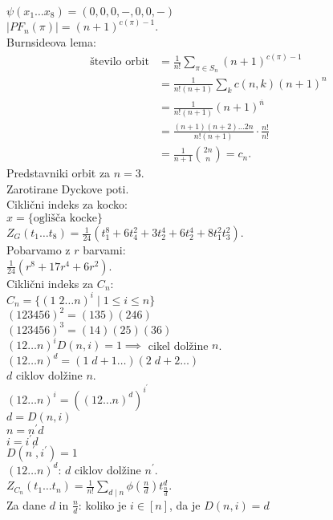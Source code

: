 \documentclass[a4paper, 12pt]{book}
\theoremstyle{definition}
\theoremstyle{remark}
\begin{document}
$\psi(x_1 \dots x_8) = (0, 0, 0, -, 0, 0, -)$ \\
$|PF_n(\pi)| = (n+1)^{c(\pi)-1}$. \\
Burnsideova lema:
\begin{align*}
  \text{število orbit} &= \frac{1}{n!} \sum_{\pi \in S_n} (n+1)^{c(\pi)-1} \\
  &= \frac{1}{n! (n+1)} \sum_k c(n, k) (n+1)^n \\
  &= \frac{1}{n! (n+1)} (n+1)^{\overline{n}} \\
  &= \frac{(n+1) (n+2) \dots 2n}{n! (n+1)} \cdot \frac{n!}{n!} \\
  &= \frac{1}{n+1} \binom{2n}{n} = c_n.
\end{align*}
Predstavniki orbit za $n=3$. \\
Zarotirane Dyckove poti. \\
Ciklični indeks za kocko: \\
$x = \{\text{oglišča kocke}\}$ \\
$Z_G(t_1 \dots t_8) = \frac{1}{24} \left(t_1^8 + 6 t_4^2 + 3 t_2^4 + 6 t_2^4 + 8 t_1^2 t_3^2\right)$. \\
Pobarvamo z $r$ barvami: \\
$\frac{1}{24} \left(r^8 + 17r^4 + 6r^2\right)$. \\
Ciklični indeks za $C_n$: \\
$C_n = \{(1 \; 2 \dots n)^i \mid 1 \leq i \leq n\}$ \\
$(1 2 3 4 5 6)^2 = (1 3 5) (2 4 6)$ \\
$(1 2 3 4 5 6)^3 = (1 4) (2 5) (3 6)$ \\
$(1 2 \dots n)^i D(n, i) = 1 \implies$ cikel dolžine $n$. \\
$(1 2 \dots n)^d = (1 \; d+1 \dots) (2 \; d+2 \dots)$ \\
$d$ ciklov dolžine $n$. \\
$(1 2 \dots n)^i = \left( (1 2 \dots n)^d \right)^{i^{'}}$ \\
$d = D(n, i)$ \\
$n = n^{'} d$ \\
$i = i^{'} d$ \\
$D(n^{'}, i^{'}) = 1$ \\
$(1 2 \dots n)^d$: $d$ ciklov dolžine $n^{'}$. \\
$Z_{C_n}(t_1 \dots t_n) = \frac{1}{n!} \sum_{d \mid n} \phi\left(\frac{n}{d}\right) t_{\frac{n}{d}}^d$. \\
Za dane $d$ in $\frac{n}{d}$: koliko je $i \in [n]$, da je $D(n, i) = d$ \\
\end{document}
